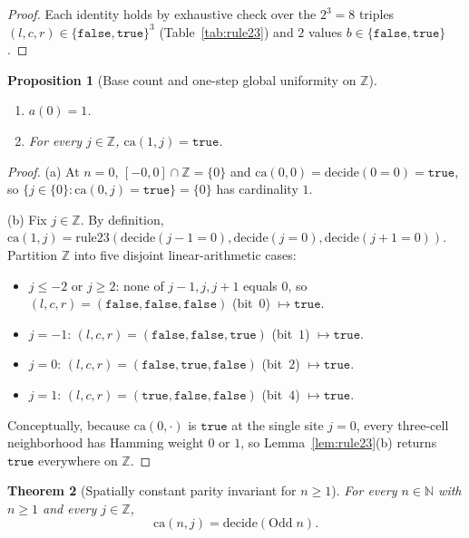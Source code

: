 \documentclass[11pt]{article}
\newtheorem{theorem}{Theorem}[section]
\newtheorem{proposition}[theorem]{Proposition}
\theoremstyle{definition}
\newcommand{\N}{\mathbb{N}}
\newcommand{\Z}{\mathbb{Z}}
\newcommand{\ca}{\mathrm{ca}}
\newcommand{\ruleTwoThree}{\mathrm{rule23}}
\newcommand{\btrue}{\mathtt{true}}
\newcommand{\bfalse}{\mathtt{false}}
\begin{document}
\begin{proof}
Each identity holds by exhaustive check over the $2^3 = 8$ triples $(l, c, r) \in \{\bfalse, \btrue\}^3$ (Table~\ref{tab:rule23}) and $2$ values $b \in \{\bfalse, \btrue\}$.
\end{proof}

\begin{proposition}[Base count and one-step global uniformity on $\Z$]
\label{prop:early}
\leavevmode
\begin{enumerate}
\item[\textup{(a)}] $a(0) = 1$.
\item[\textup{(b)}] For every $j \in \Z$, $\ca(1, j) = \btrue$.
\end{enumerate}
\end{proposition}

\begin{proof}
(a) At $n = 0$, $[-0, 0] \cap \Z = \{0\}$ and $\ca(0, 0) = \mathrm{decide}(0 = 0) = \btrue$, so $\{j \in \{0\} : \ca(0, j) = \btrue\} = \{0\}$ has cardinality $1$.

(b) Fix $j \in \Z$. By definition, $\ca(1, j) = \ruleTwoThree(\mathrm{decide}(j - 1 = 0), \mathrm{decide}(j = 0), \mathrm{decide}(j + 1 = 0))$. Partition $\Z$ into five disjoint linear-arithmetic cases:
\begin{itemize}
\item $j \le -2$ or $j \ge 2$: none of $j - 1, j, j + 1$ equals $0$, so $(l, c, r) = (\bfalse, \bfalse, \bfalse)$ (bit~$0$) $\mapsto \btrue$.
\item $j = -1$: $(l, c, r) = (\bfalse, \bfalse, \btrue)$ (bit~$1$) $\mapsto \btrue$.
\item $j = 0$: $(l, c, r) = (\bfalse, \btrue, \bfalse)$ (bit~$2$) $\mapsto \btrue$.
\item $j = 1$: $(l, c, r) = (\btrue, \bfalse, \bfalse)$ (bit~$4$) $\mapsto \btrue$.
\end{itemize}
Conceptually, because $\ca(0, \cdot)$ is $\btrue$ at the single site $j = 0$, every three-cell neighborhood has Hamming weight $0$ or $1$, so Lemma~\ref{lem:rule23}(b) returns $\btrue$ everywhere on $\Z$.
\end{proof}

\begin{theorem}[Spatially constant parity invariant for $n \ge 1$]
\label{thm:invariant}
For every $n \in \N$ with $n \ge 1$ and every $j \in \Z$,
\[
\ca(n, j) = \mathrm{decide}(\mathrm{Odd}\; n).
\]
\end{theorem}
\end{document}
